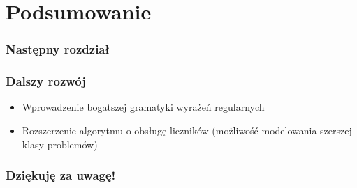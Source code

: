 \documentclass{beamer}
\begin{document}
    \section{Podsumowanie}
    \begin{frame}
		\frametitle{Następny rozdział}
        \tableofcontents[currentsection]
    \end{frame}
    \begin{frame}
    	\frametitle{Dalszy rozwój}
        \begin{itemize}
            \item Wprowadzenie bogatszej gramatyki wyrażeń regularnych
            \item Rozszerzenie algorytmu o obsługę liczników (możliwość modelowania szerszej klasy problemów)
        \end{itemize}
    \end{frame}
    \begin{frame}
        \frametitle{Dziękuję za uwagę!}
    \end{frame}
\end{document}
